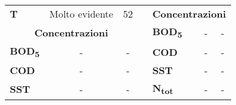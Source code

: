 \begin{table}[H]
\begin{center}
\begin{tabular}{lccllcc}
		\multicolumn{1}{|l|}{\textbf{T}}         & \multicolumn{1}{c|}{\cellcolor[HTML]{C0C0C0}Molto evidente}                                   & \multicolumn{1}{c|}{52}                                                                         & \multicolumn{1}{l|}{} & \multicolumn{3}{c|}{\textbf{Concentrazioni}}                                                                                                                                                                                                    \\ \cline{1-3} \cline{5-7} 
		\multicolumn{3}{|c|}{\textbf{Concentrazioni}}                                                                                                                                                                                              & \multicolumn{1}{l|}{} & \multicolumn{1}{l|}{\textbf{BOD\textsubscript{5}}}             & \multicolumn{1}{c|}{-}                                                                       & \multicolumn{1}{c|}{-}                                                                          \\ \cline{1-3} \cline{5-7} 
		\multicolumn{1}{|l|}{\textbf{BOD\textsubscript{5}}}      & \multicolumn{1}{c|}{-}                                                                        & \multicolumn{1}{c|}{-}                                                                          & \multicolumn{1}{l|}{} & \multicolumn{1}{l|}{\textbf{COD}}              & \multicolumn{1}{c|}{-}                                                                       & \multicolumn{1}{c|}{-}                                                                          \\ \cline{1-3} \cline{5-7} 
		\multicolumn{1}{|l|}{\textbf{COD}}       & \multicolumn{1}{c|}{-}                                                                        & \multicolumn{1}{c|}{-}                                                                          & \multicolumn{1}{l|}{} & \multicolumn{1}{l|}{\textbf{SST}}              & \multicolumn{1}{c|}{-}                                                                       & \multicolumn{1}{c|}{-}                                                                          \\ \cline{1-3} \cline{5-7} 
		\multicolumn{1}{|l|}{\textbf{SST}}       & \multicolumn{1}{c|}{-}                                                                        & \multicolumn{1}{c|}{-}                                                                          & \multicolumn{1}{l|}{} & \multicolumn{1}{l|}{\textbf{N\textsubscript{tot}}}             & \multicolumn{1}{c|}{-}                                                                       & \multicolumn{1}{c|}{-}                                                                          \\ \cline{1-3} \cline{5-7} 

\end{tabular}
\end{center}
\end{table}
